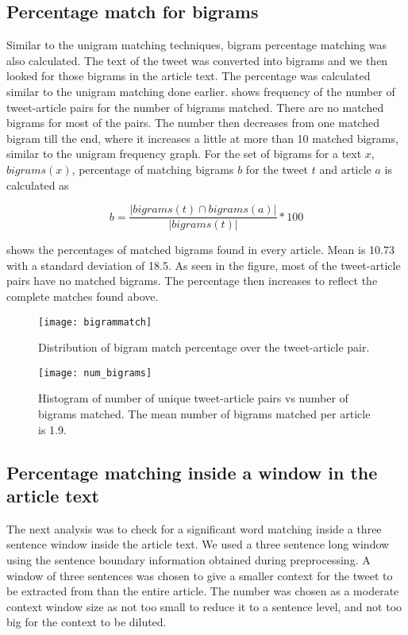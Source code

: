 \subsection{Percentage match for bigrams}

Similar to the unigram matching techniques, bigram percentage matching was also calculated. The text of the tweet was converted into bigrams and we then looked for those bigrams in the article text. The percentage was calculated similar to the unigram matching done earlier.  shows frequency of the number of tweet-article pairs for the number of bigrams matched. There are no matched bigrams for most of the pairs. The number then decreases from one matched bigram till the end, where it increases a little at more than 10 matched bigrams, similar to the unigram frequency graph. For the set of bigrams for a text $x$, $\textit{bigrams}(x)$, percentage of matching bigrams $b$ for the tweet $t$ and article $a$ is calculated as 

\begin{equation}
b = \frac{| bigrams(t) \cap bigrams(a) |}{| bigrams(t) |} * 100
\end{equation}

 shows the percentages of matched bigrams found in every article. Mean is 10.73 with a standard deviation of 18.5. As seen in the figure, most of the tweet-article pairs have no matched bigrams. The percentage then increases to reflect the complete matches found above.

\begin{figure}[htbp]
\centering
\texttt{[image: bigrammatch]}
\caption{Distribution of bigram match percentage over the tweet-article pair.}
\label{fig:bigrammatch}
\end{figure}

\begin{figure}[htbp]
\centering
\texttt{[image: num\_bigrams]}
\caption{Histogram of number of unique tweet-article pairs vs number of bigrams matched. The mean number of bigrams matched per article is 1.9.}
\label{fig:num_bigrams}
\end{figure}

\subsection{Percentage matching inside a window in the article text}

The next analysis was to check for a significant word matching inside a three sentence window inside the article text. We used a three sentence long window using the sentence boundary information obtained during preprocessing. A window of three sentences was chosen to give a smaller context for the tweet to be extracted from than the entire article. The number was chosen as a moderate context window size as not too small to reduce it to a sentence level, and not too big for the context to be diluted. 

